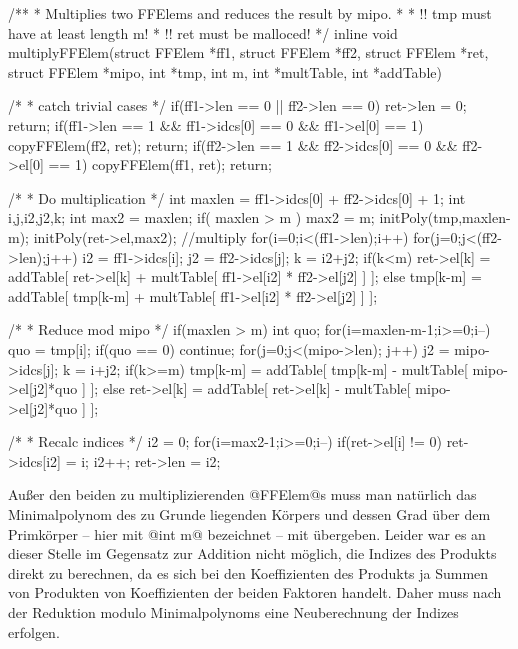 \begin{ccode}[caption={Aus \url{../Sage/enumeratePCNs.c}}]
/**
 * Multiplies two FFElems and reduces the result by mipo.
 *
 * !! tmp must have at least length m!
 * !! ret must be malloced!
 */
inline void multiplyFFElem(struct FFElem *ff1, struct FFElem *ff2, 
        struct FFElem *ret, 
        struct FFElem *mipo, int *tmp, int m,
        int *multTable, int *addTable){
    /* 
     * catch trivial cases
     */
    if(ff1->len == 0 || ff2->len == 0){
        ret->len = 0;
        return;
    }
    if(ff1->len == 1 && ff1->idcs[0] == 0 && ff1->el[0] == 1){
        copyFFElem(ff2, ret);
        return;
    }
    if(ff2->len == 1 && ff2->idcs[0] == 0 && ff2->el[0] == 1){
        copyFFElem(ff1, ret);
        return;
    }

    /*
     * Do multiplication
     */
    int maxlen = ff1->idcs[0] + ff2->idcs[0] + 1;
    int i,j,i2,j2,k;
    int max2 = maxlen;
    if( maxlen > m ){
        max2 = m;
        initPoly(tmp,maxlen-m);
    }
    initPoly(ret->el,max2);
    //multiply 
    for(i=0;i<(ff1->len);i++){
        for(j=0;j<(ff2->len);j++){
            i2 = ff1->idcs[i];
            j2 = ff2->idcs[j];
            k = i2+j2;
            if(k<m){
                ret->el[k] = addTable[ ret->el[k] + 
                    multTable[ ff1->el[i2] * ff2->el[j2] ] ];
            }else{
                tmp[k-m] = addTable[ tmp[k-m] +
                    multTable[ ff1->el[i2] * ff2->el[j2] ] ];
            }
        }
    }
    
    /*
     * Reduce mod mipo
     */
    if(maxlen > m){
        int quo;
        for(i=maxlen-m-1;i>=0;i--){
            quo = tmp[i];
            if(quo == 0) continue;
            for(j=0;j<(mipo->len); j++){
                j2 = mipo->idcs[j];
                k = i+j2;
                if(k>=m){
                    tmp[k-m] = addTable[ tmp[k-m] - 
                        multTable[ mipo->el[j2]*quo ] ];
                }else{
                    ret->el[k] = addTable[ ret->el[k] - 
                        multTable[ mipo->el[j2]*quo ] ];
                }
            }
        }
    }

    /*
     * Recalc indices
     */
    i2 = 0;
    for(i=max2-1;i>=0;i--){
        if(ret->el[i] != 0){
            ret->idcs[i2] = i;
            i2++;
        }
    }
    ret->len = i2;
}
\end{ccode}
Außer den beiden zu multiplizierenden @FFElem@s muss man natürlich das
Minimalpolynom des zu Grunde liegenden Körpers und dessen Grad über dem
Primkörper -- hier mit @int m@ bezeichnet -- mit übergeben.
Leider war es an dieser Stelle im Gegensatz zur Addition nicht 
möglich, die Indizes des Produkts direkt zu berechnen, da es sich bei den
Koeffizienten des Produkts ja Summen von Produkten von Koeffizienten der beiden
Faktoren handelt. Daher muss nach der
Reduktion modulo Minimalpolynoms eine Neuberechnung der Indizes erfolgen.


